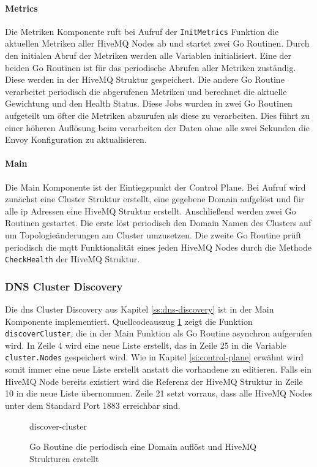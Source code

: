 \paragraph{Metrics}
Die Metriken Komponente ruft bei Aufruf der \verb|InitMetrics| Funktion die aktuellen Metriken aller HiveMQ Nodes ab und startet zwei Go Routinen. Durch den initialen Abruf der Metriken werden alle Variablen initialisiert. Eine der beiden Go Routinen ist für das periodische Abrufen aller Metriken zuständig. Diese werden in der HiveMQ Struktur gespeichert. Die andere Go Routine verarbeitet periodisch die abgerufenen Metriken und berechnet die aktuelle Gewichtung und den Health Status. Diese Jobs wurden in zwei Go Routinen aufgeteilt um öfter die Metriken abzurufen als diese zu verarbeiten. Dies führt zu einer höheren Auflösung beim verarbeiten der Daten ohne alle zwei Sekunden die Envoy Konfiguration zu aktualisieren.

\paragraph{Main}
Die Main Komponente ist der Eintiegspunkt der Control Plane. Bei Aufruf wird zunächst eine Cluster Struktur erstellt, eine gegebene Domain aufgelöst und für alle \ac{ip} Adressen eine HiveMQ Struktur erstellt.
Anschlie{\ss}end werden zwei Go Routinen gestartet. Die erste löst periodisch den Domain Namen des Clusters auf um Topologieänderungen am Cluster umzusetzen. Die zweite Go Routine prüft periodisch die \ac{mqtt} Funktionalität eines jeden HiveMQ Nodes durch die Methode \verb|CheckHealth| der HiveMQ Struktur.

\subsubsection{DNS Cluster Discovery}
Die \ac{dns} Cluster Discovery aus Kapitel \ref{ss:dns-discovery} ist in der Main Komponente implementiert. Quellcodeauszug \ref{code:discover-cluster} zeigt die Funktion \verb|discoverCluster|, die in der Main Funktion als Go Routine asynchron aufgerufen wird.
In Zeile 4 wird eine neue Liste erstellt, das in Zeile 25 in die Variable \verb|cluster.Nodes| gespeichert wird. Wie in Kapitel \ref{si:control-plane} erwähnt wird somit immer eine neue Liste erstellt anstatt die vorhandene zu editieren.
Falls ein HiveMQ Node bereits existiert wird die Referenz der HiveMQ Struktur in Zeile 10 in die neue Liste übernommen.
Zeile 21 setzt vorraus, dass alle HiveMQ Nodes unter dem Standard Port 1883 erreichbar sind.
\begin{figure}
    {discover-cluster}
    \caption{Go Routine die periodisch eine Domain auflöst und HiveMQ Strukturen erstellt}
    \label{code:discover-cluster}
\end{figure}

